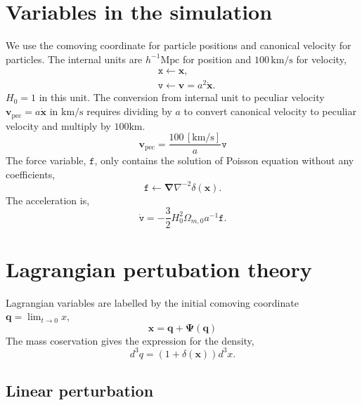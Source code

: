 \documentclass[a4paper]{article}
\begin{document}
\section{Variables in the simulation}
We use the comoving coordinate for particle positions and canonical
velocity for particles. The internal units are $h^{-1}
\mathrm{Mpc}$ for position and $100 \,\mathrm{km/s}$ for velocity, 
\begin{align}
  &\texttt{x} \leftarrow \bm{x},\\
  &\texttt{v} \leftarrow \bm{v} = a^2 \dot{\bm{x}}.
\end{align}
$H_0 = 1$ in this unit.
%
The conversion from internal unit to peculiar velocity
$\bm{v}_\mathrm{pec} = a \dot{\bm{x}}$ in $\mathrm{km}/\mathrm{s}$
requires dividing by $a$ to convert canonical velocity to peculiar
velocity and multiply by $100
\mathrm{km}$.
\begin{equation}
  \bm{v}_\mathrm{pec} = \frac{100 \,\mathrm{[km/s]}}{a} \texttt{v}
\end{equation}
%
The force variable, $\texttt{f}$, only contains the solution of Poisson
equation without any coefficients,
%
\begin{equation}
  \texttt{f} \leftarrow \bm{\nabla} \nabla^{-2} \delta(\bm{x}).
\end{equation}
%
The acceleration is,
\begin{equation}
  \dot{\texttt{v}} = -\frac{3}{2} H_0^2 \Omega_{m,0} a^{-1} \texttt{f}.
\end{equation}

\section{Lagrangian pertubation theory}
Lagrangian variables are labelled by the initial comoving coordinate $\bm{q} = \lim_{t \rightarrow 0} x$,
\begin{equation}
  \bm{x} = \bm{q} + \bm{\Psi}(\bm{q})
\end{equation}
The mass coservation gives the expression for the density,
\begin{equation}
  d^3 q = (1 + \delta(\bm{x})) d^3 x.
\end{equation}

\subsection{Linear perturbation}
\end{document}

